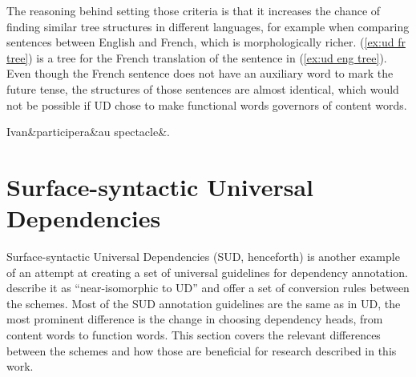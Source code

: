 The reasoning behind setting those criteria is that it increases the chance of finding similar tree structures in different languages, for example when comparing sentences between English and French, which is morphologically richer. (\ref{ex:ud fr tree}) is a tree for the French translation of the sentence in (\ref{ex:ud eng tree}). Even though the French sentence does not have an auxiliary word to mark the future tense, the structures of those sentences are almost identical, which would not be possible if UD chose to make functional words governors of content words.

\begin{exe}
    \ex
    \label{ex:ud fr tree}
    \begin{dependency}[theme = simple, baseline=-\the\dimexpr\fontdimen22\textfont2\relax]
        \begin{deptext}
            Ivan\&participera\&au spectacle\&.\\
        \end{deptext}
    \end{dependency}
\end{exe}

\section{Surface-syntactic Universal Dependencies}\label{sec:sud}
Surface-syntactic Universal Dependencies (SUD, henceforth) is another example of an attempt at creating a set of universal guidelines for dependency annotation. \cite{gerdes-etal-2018-sud} describe it as ``near-isomorphic to UD'' and offer a set of conversion rules between the schemes. Most of the SUD annotation guidelines are the same as in UD, the most prominent difference is the change in choosing dependency heads, from content words to function words. This section covers the relevant differences between the schemes and how those are beneficial for research described in this work.

